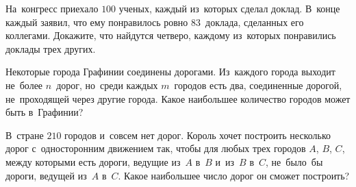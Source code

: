 \begin{problems}
\item
На~конгресс приехало $100$ ученых, каждый из~которых сделал доклад.
В~конце каждый заявил, что ему понравилось ровно $83$~доклада, сделанных его
коллегами.
Докажите, что найдутся четверо, каждому из~которых понравились доклады трех
других.

\item
Некоторые города Графинии соединены дорогами.
Из~каждого города выходит не~более $n$~дорог, но~среди каждых $m$~городов есть
два, соединенные дорогой, не~проходящей через другие города.
Какое наибольшее количество городов может быть в~Графинии?

\item
В~стране $210$ городов и~совсем нет дорог.
Король хочет построить несколько дорог с~односторонним движением так, чтобы для
любых трех городов $A$, $B$, $C$, между которыми есть дороги, ведущие
из~$A$ в~$B$ и~из~$B$ в~$C$, не~было~бы дороги, ведущей из~$A$ в~$C$.
Какое наибольшее число дорог он сможет построить?

\end{problems}

